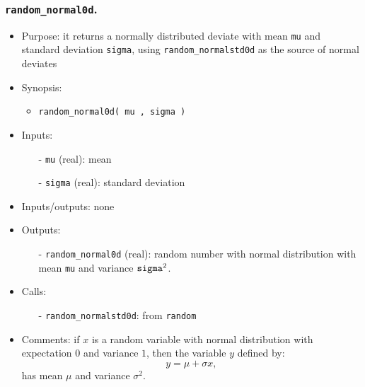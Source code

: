 \documentclass[12pt]{article}
\begin{document}
\subsubsection{{\tt random\_normal0d}.}
\begin{itemize}
\item Purpose: it returns a normally distributed deviate with mean {\tt mu} and standard deviation {\tt sigma}, using {\tt random\_normalstd0d} as the source of normal deviates
\item Synopsis: 
\begin{itemize}
\item {\tt random\_normal0d( mu , sigma )}
\end{itemize}
\item Inputs: 
\begin{itemize}
\item[-] {\tt mu} (real): mean
\item[-] {\tt sigma} (real): standard deviation
\end{itemize}
\item Inputs/outputs: none
\item Outputs:
\begin{itemize}
\item[-] {\tt random\_normal0d} (real): random number with normal distribution with mean {\tt mu} and variance ${\tt sigma}^2$.
\end{itemize}
\item Calls: 
\begin{itemize}
\item[-] {\tt random\_normalstd0d}: from {\tt random}
\end{itemize}
\item Comments: if $x$ is a random variable with normal distribution with expectation $0$ and variance $1$, then the variable $y$ defined by:
\begin{equation}
y = \mu + \sigma x, 
\end{equation} 
has mean $\mu$ and variance $\sigma^2$.
\end{itemize} 
\end{document}
